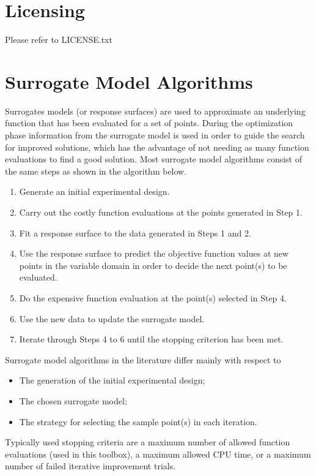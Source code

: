 \documentclass[]{article}
\begin{document}
\section{Licensing} Please refer to LICENSE.txt

\section{Surrogate Model Algorithms}
Surrogates models (or response surfaces) are used to approximate an underlying function that has been evaluated for a set of points. During the optimization phase information from the surrogate model is used in order to guide the search for improved solutions, which has the advantage of not needing as many function evaluations to find a good solution. Most surrogate model algorithms consist of the same steps as shown in the algorithm below.
\begin{enumerate}
\item Generate an initial experimental design.
\item Carry out the costly function evaluations at the points generated in Step 1.
\item Fit a response surface to the data generated in Steps 1 and 2.
\item Use the response surface to predict the objective function values at new points in the variable domain in order to decide the next point(s) to be evaluated.
\item Do the expensive function evaluation at the point(s) selected in Step 4.
\item Use the new data to update the surrogate model.
\item Iterate through Steps 4 to 6 until the stopping criterion has been met.
\end{enumerate}

\noindent Surrogate model algorithms in the literature differ mainly with respect to

\begin{itemize}
\item The generation of the initial experimental design;
\item The chosen surrogate model;
\item The strategy for selecting the sample point(s) in each iteration.
\end{itemize}

\noindent Typically used stopping criteria are a maximum number of allowed function evaluations (used in this toolbox), a maximum allowed CPU time, or a maximum number of failed iterative improvement trials.
\end{document}
